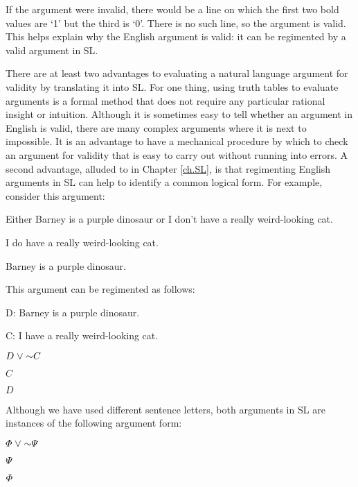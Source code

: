If the argument were invalid, there would be a line on which the first two bold values are `1' but the third is `0'.
There is no such line, so the argument is valid.
This helps explain why the English argument is valid: it can be regimented by a valid argument in SL.

There are at least two advantages to evaluating a natural language argument for validity by translating it into SL.
For one thing, using truth tables to evaluate arguments is a formal method that does not require any particular rational insight or intuition.
Although it is sometimes easy to tell whether an argument in English is valid, there are many complex arguments where it is next to impossible.
It is an advantage to have a mechanical procedure by which to check an argument for validity that is easy to carry out without running into errors.
A second advantage, alluded to in Chapter \ref{ch.SL}, is that regimenting English arguments in SL can help to identify a common logical form.
For example, consider this argument:

\begin{earg}
  \item Either Barney is a purple dinosaur or I don't have a really weird-looking cat.
  \item I do have a really weird-looking cat.
  \item[\therefore] Barney is a purple dinosaur.
\end{earg}

This argument can be regimented as follows:

\begin{ekey}
  \item[D:] Barney is a purple dinosaur.
  \item[C:] I have a really weird-looking cat.
\end{ekey}

\begin{earg}
  \item $D\eor\enot C$
  \item $C$
  \item[\therefore] $D$
\end{earg}

Although we have used different sentence letters, both arguments in SL are instances of the following argument form:

\begin{earg}
  \item $\metaA{}\eor\enot \metaB{}$
  \item $\varPsi{}$
  \item[\therefore] $\varPhi{}$
\end{earg}

